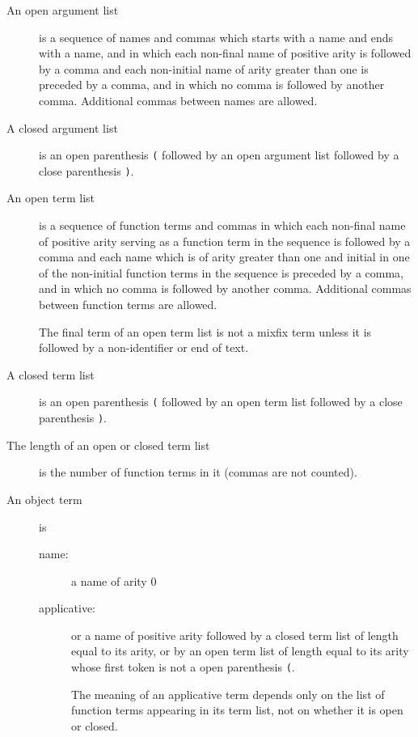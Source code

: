 \documentclass[12pt]{article}
\begin{document}
\begin{description}

\item [An open argument list]  is a sequence of names and commas which starts with a name and ends with a name, and in which each non-final name of positive arity
is followed by a comma and each non-initial name of arity greater than one  is preceded by a comma, and in which no comma is followed by another comma.  Additional commas
between names are allowed.

\item [A closed argument list] is an open parenthesis \verb|(| followed by an open argument list followed by a close parenthesis \verb|)|.

\item [An open term list]  is a sequence of function terms and commas  in which each non-final name of positive arity serving as a function term in the sequence
is followed by a comma and each name which is of arity greater than one  and initial in one of the non-initial function terms in the sequence  is preceded by a comma, and in which no comma is followed by another comma.  Additional commas between function terms are allowed.

The final term of an open term list is not a mixfix term unless it is followed by a non-identifier or end of text.

\item [A closed term list] is an open parenthesis \verb|(| followed by an open term list followed by a close parenthesis \verb|)|.

\item [The length of an open or closed term list] is the number of function terms in it (commas are not counted).

\item [An object term] is 

\begin{description}

\item[name:]   a name of arity 0 

\item[applicative:]   or a name of positive arity followed by a closed term list of length equal to its arity, or by an open term list of length equal to its arity whose first token is not a open parenthesis \verb|(|. 

The meaning of an applicative term depends only on the list of function terms appearing in its term list, not on whether it is open or closed.


\end{description}
\end{description}
\end{document}
